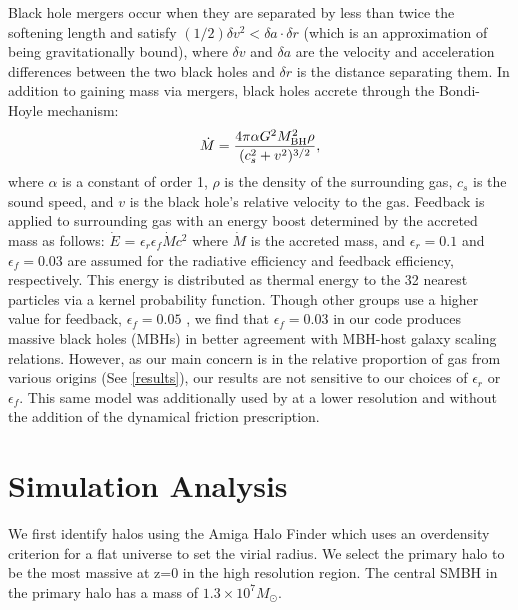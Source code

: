 \documentclass[]{emulateapj}
\begin{document}
Black hole mergers occur when they are separated by less than twice the softening length and satisfy $(1/2) \delta v^2 < \delta a \cdot \delta r$ (which is an approximation of being gravitationally bound),  where $\delta v$ and $\delta a$ are the velocity and acceleration differences between the two black holes and $\delta r$ is the distance separating them. In addition to gaining mass via mergers, black holes accrete through the Bondi-Hoyle mechanism:
\begin{equation}
\dot{M} = \frac{4 \pi \alpha G^2 M^{2}_{\rm BH} \rho}{(c^{2}_{s} + v^2)^{3/2}},
\end{equation}
where $\alpha$ is a constant of order 1, $\rho$ is the density of the surrounding gas, $c_s$ is the sound speed, and $v$ is the black hole's relative velocity to the gas. Feedback is applied to surrounding gas with an energy boost determined by the accreted mass as follows: $\dot{E}$ = $\epsilon _{r}$$\epsilon_{f}$$\dot{M}$$c^2$ where $\dot{M}$ is the accreted mass, and $\epsilon _r = 0.1$ and $\epsilon _f = 0.03$ are assumed for the radiative efficiency and feedback efficiency, respectively. This energy is distributed as thermal energy to the 32 nearest particles via a kernel probability function. Though other groups use a higher value for feedback, $\epsilon _f = 0.05$ \citep{Sijacki2007,DiMatteo2008}, we find that $\epsilon_f = 0.03$ in our code produces massive black holes (MBHs) in better agreement with MBH-host galaxy scaling relations. However, as our main concern is in the relative proportion of gas  from various origins (See \ref{results}), our results are not sensitive to our choices of $\epsilon _{r}$ or $\epsilon_{f}$. This same model was additionally used by \cite{Bellovary2013} at a lower resolution and without the addition of the dynamical friction prescription. 







\section{Simulation Analysis}\label{redux}

We first identify halos using the Amiga Halo Finder which uses an overdensity criterion for a flat universe \citep{Knebe2001,Knollmann2009,Gill2004} to set the virial radius. We select the primary halo to be the most massive at z=0 in the high resolution region. The central SMBH in the primary halo has a mass of $1.3 \times 10^{7} M_{\odot}$.  
\end{document}
